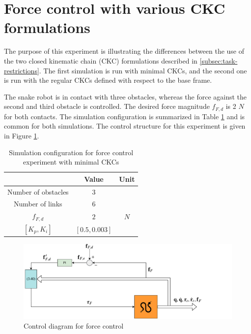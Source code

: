 \section{Force control with various CKC formulations}\label{sec:2xminiJforce}

The purpose of this experiment is illustrating the differences between the use of the two closed kinematic chain (CKC) formulations described in \ref{subsec:task-restrictions}. The first simulation is run with minimal CKCs, and the second one is run with the regular CKCs defined with respect to the base frame.

The snake robot is in contact with three obstacles, whereas the force against the second and third obstacle is controlled. The desired force magnitude $f_{F,d}$ is 2 $N$ for both contacts. The simulation configuration is summarized in Table \ref{tab:exp_2xf} and is common for both simulations. The control structure for this experiment is given in Figure \ref{fig:diag-f}.

\begin{table}[]
    \centering
    \begin{tabular}{|c|c|c|}
        \hline
        & Value & Unit\\
        \hline
        Number of obstacles & $3$ & \\
        Number of links & $6$ & \\
        $f_{F,d}$ & $2$ & $N$ \\
        $[K_{p}, K_{i}]$ & $[0.5, 0.003]$ &\\
        \hline
    \end{tabular}
    \caption{Simulation configuration for force control experiment with minimal CKCs}
    \label{tab:exp_2xf}
\end{table}

\begin{figure}
    \centering
    \includegraphics[trim=0cm 0cm 3cm 0cm, clip=true, width=\textwidth]{figures/experiments/control-diagrams/2f-control-diagram.pdf}
    \caption{Control diagram for force control}
    \label{fig:diag-f}
\end{figure}

